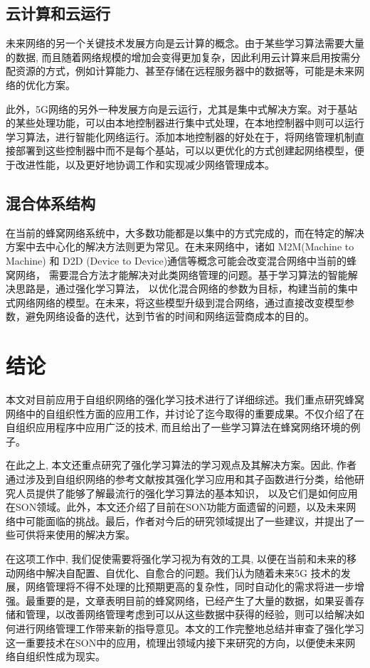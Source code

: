 \documentclass{IEEEtran}
\begin{document}
\subsection{云计算和云运行}
未来网络的另一个关键技术发展方向是云计算的概念。由于某些学习算法需要大量的数据, 而且随着网络规模的增加会变得更加复杂，因此利用云计算来启用按需分配资源的方式，例如计算能力、甚至存储在远程服务器中的数据等，可能是未来网络的优化方案。

此外，5G网络的另外一种发展方向是云运行，尤其是集中式解决方案。对于基站的某些处理功能，可以由本地控制器进行集中式处理，在本地控制器中则可以运行学习算法，进行智能化网络运行。添加本地控制器的好处在于，将网络管理机制直接部署到这些控制器中而不是每个基站，可以以更优化的方式创建起网络模型，便于改进性能，以及更好地协调工作和实现减少网络管理成本。

\subsection{混合体系结构}
在当前的蜂窝网络系统中，大多数功能都是以集中的方式完成的，而在特定的解决方案中去中心化的解决方法则更为常见。在未来网络中，诸如 M2M(Machine to Machine) 和 D2D (Device to Device)通信等概念可能会改变混合网络中当前的蜂窝网络， 需要混合方法才能解决对此类网络管理的问题。基于学习算法的智能解决思路是，通过强化学习算法， 以优化混合网络的参数为目标，构建当前的集中式网络网络的模型。在未来，将这些模型升级到混合网络，通过直接改变模型参数，避免网络设备的迭代，达到节省的时间和网络运营商成本的目的。

\section{结论}
\label{sec:Conclusion}

本文对目前应用于自组织网络的强化学习技术进行了详细综述。我们重点研究蜂窝网络中的自组织性方面的应用工作，并讨论了迄今取得的重要成果。不仅介绍了在自组织应用程序中应用广泛的技术, 而且给出了一些学习算法在蜂窝网络环境的例子。

在此之上, 本文还重点研究了强化学习算法的学习观点及其解决方案。因此, 作者通过涉及到自组织网络的参考文献按其强化学习应用和其子函数进行分类，给他研究人员提供了能够了解最流行的强化学习算法的基本知识， 以及它们是如何应用在SON领域。此外，本文还介绍了目前在SON功能方面遗留的问题，以及未来网络中可能面临的挑战。最后，作者对今后的研究领域提出了一些建议，并提出了一些可供将来使用的解决方案。

在这项工作中, 我们促使需要将强化学习视为有效的工具, 以便在当前和未来的移动网络中解决自配置、自优化、自愈合的问题。我们认为随着未来5G 技术的发展，网络管理将不得不处理的比预期更高的复杂性，同时自动化的需求将进一步增强。最重要的是，文章表明目前的蜂窝网络，已经产生了大量的数据，如果妥善存储和管理，以改善网络管理考虑到可以从这些数据中获得的经验，则可以给解决如何进行网络管理工作带来新的指导意见。本文的工作完整地总结并审查了强化学习这一重要技术在SON中的应用，梳理出领域内接下来研究的方向，以便使未来网络自组织性成为现实。




\end{document}
